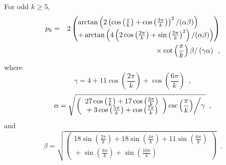 \documentclass[twoside,leqno,twocolumn]{article}
\begin{document}
\begin{lem}
  For odd $k\ge 5$,
\begin{eqnarray*}
p_k &=&
2
\left(\begin{array}{@{}l@{}}
  \arctan\left(
     2\left(\cos\left(\frac{\pi }{k}\right)
       +\cos\left(\frac{3 \pi }{k}\right)\right)^2 / (\alpha\beta) 
  \right) \\
   + \arctan\left(
       4 \left(2 \cos\left(\frac{2 \pi }{k}\right)
       +\sin\left(\frac{2 \pi }{k}\right)^2\right)/(\alpha\beta) 
     \right)
  \end{array}
\right) 
\\
&& {}\times
\cot\left(\frac{\pi }{k}\right) 
\beta
/
\left(\gamma \alpha\right)\enspace ,
\end{eqnarray*}
where
\[
\gamma =4+11 \cos\left(\frac{2 \pi }{k}\right)+\cos\left(\frac{6 \pi }{k}\right) \enspace ,
\]
\newcommand{\slfrac}[2]{\left.#1\middle/#2\right.}
\[
\alpha = 
\sqrt{\slfrac{\left(\begin{array}{l}27 \cos\left(\frac{\pi }{k}\right)+17 \cos\left(\frac{3 \pi }{k}\right)\\{}+3 \cos\left(\frac{5 \pi }{k}\right)+\cos\left(\frac{7 \pi }{k}\right)\end{array}\right) \csc\left(\frac{\pi }{k}\right)}{\gamma}} \enspace ,
\]
and
\[
\beta = \sqrt{\left(\begin{array}{l}18 \sin\left(\frac{2 \pi }{k}\right)+18 \sin\left(\frac{4 \pi }{k}\right)+11 \sin\left(\frac{6 \pi }{k}\right)\\ {}+\sin\left(\frac{8 \pi }{k}\right)+\sin\left(\frac{10 \pi }{k}\right)\end{array}\right)} \enspace .
\]
\end{lem}
\end{document}
